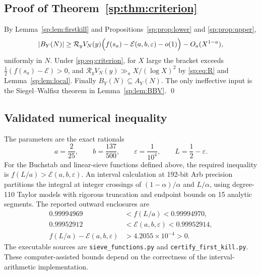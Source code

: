 \documentclass[final,11pt]{elsarticle}
\theoremstyle{definition}
\theoremstyle{remark}
\newcommand{\R}{\mathcal R}
\newcommand{\E}{\mathcal E}
\numberwithin{equation}{section}
\begin{document}
\subsection{Proof of Theorem~\ref{sp:thm:criterion}}\label{sp:sec:proof}

By Lemma~\ref{sp:lem:firstkill} and Propositions~\ref{sp:prop:lower} and
\ref{sp:prop:upper},
\[
 |B_Y(N)|\ge\R_yV_N(y)\Bigl(f(s_a)-\E(a,b,\varepsilon)-o(1)\Bigr)-O_a(X^{1-a}),
\]
uniformly in $N$. Under \eqref{sp:eq:criterion}, for $X$ large the bracket exceeds
$\frac12(f(s_a)-\E)>0$, and $\R_yV_N(y)\gg_aX/(\log X)^2$ by \eqref{sp:eq:R} and
Lemma~\ref{sp:lem:local}. Finally $B_Y(N)\subseteq A_Y(N)$. The only ineffective
input is the Siegel--Walfisz theorem in Lemma~\ref{sp:lem:BBV}. \qed


\subsection{Validated numerical inequality}\label{sp:sec:numerics}
The parameters are the exact rationals
\[
 a=\frac{2}{25},\qquad b=\frac{137}{500},\qquad
 \varepsilon=\frac1{10^4},\qquad L=\frac12-\varepsilon.
\]
For the Buchstab and linear-sieve functions defined above, the required
inequality is $f(L/a)>\mathcal E(a,b,\varepsilon)$. An interval calculation
at 192-bit Arb precision partitions the integral at integer crossings of
$(1-\alpha)/\alpha$ and $L/\alpha$, using degree-110 Taylor models with
rigorous truncation and endpoint bounds on 15 analytic segments. The reported
outward enclosures are
\begin{align}
 0.99994969&<f(L/a)<0.99994970,\nonumber\\
 0.99952912&<\mathcal E(a,b,\varepsilon)<0.99952914,\nonumber\\
 f(L/a)-\mathcal E(a,b,\varepsilon)&>4.2055\times10^{-4}>0.
 \label{sp:eq:certified-margin}
\end{align}
The executable sources are \texttt{sieve\_functions.py} and
\texttt{certify\_first\_kill.py}. These computer-assisted bounds depend
on the correctness of the interval-arithmetic implementation.
\end{document}

